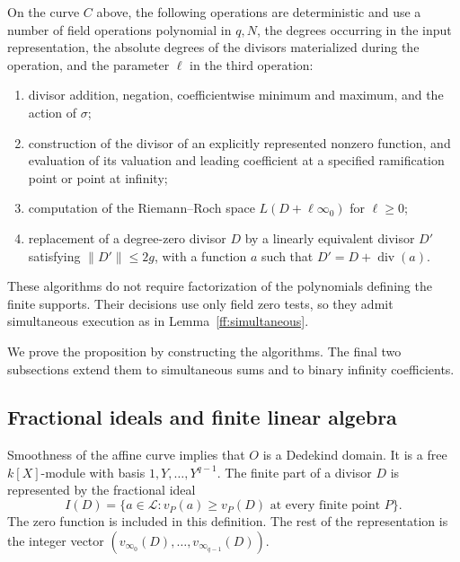 \begin{proposition}\label{div:arithmetic}
On the curve $C$ above, the following operations are deterministic and use
a number of field operations polynomial in $q,N$, the degrees occurring in
the input representation, the absolute degrees of the divisors
materialized during the operation, and the parameter $\ell$ in the third
operation:
\begin{enumerate}
 \item divisor addition, negation, coefficientwise minimum and maximum,
 and the action of $\sigma$;
 \item construction of the divisor of an explicitly represented nonzero
 function, and evaluation of its valuation and leading coefficient at a
 specified ramification point or point at infinity;
 \item computation of the Riemann--Roch space
 $L(D+\ell\infty_0)$ for $\ell\geq 0$;
 \item replacement of a degree-zero divisor $D$ by a linearly equivalent
 divisor $D'$ satisfying $\|D'\|\leq 2g$, with a function $a$ such that
 $D'=D+\operatorname{div}(a)$.
\end{enumerate}
These algorithms do not require factorization of the polynomials defining
the finite supports.  Their decisions use only field zero tests, so they
admit simultaneous execution as in Lemma~\ref{ff:simultaneous}.
\end{proposition}

We prove the proposition by constructing the algorithms.  The final two
subsections extend them to simultaneous sums and to binary infinity
coefficients.

\subsection{Fractional ideals and finite linear algebra}

Smoothness of the affine curve implies that $O$ is a Dedekind domain.  It is
a free $k[X]$-module with basis $1,Y,\ldots,Y^{q-1}$.  The finite part of a
divisor $D$ is represented by the fractional ideal
\begin{equation}\label{div:ideal}
 I(D)=\{a\in\mathcal L:v_P(a)\geq v_P(D)
                 \text{ at every finite point }P\}.
\end{equation}
The zero function is included in this definition.  The rest of the
representation is the integer vector
$(v_{\infty_0}(D),\ldots,v_{\infty_{q-1}}(D))$.

